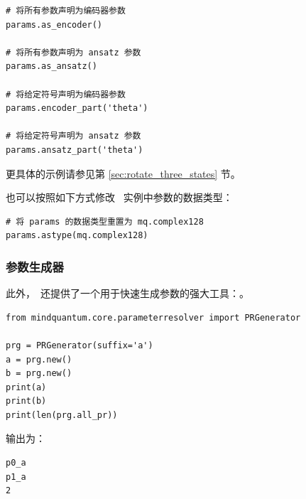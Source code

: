 \begin{lstlisting}
# 将所有参数声明为编码器参数
params.as_encoder()

# 将所有参数声明为 ansatz 参数
params.as_ansatz()

# 将给定符号声明为编码器参数
params.encoder_part('theta')

# 将给定符号声明为 ansatz 参数
params.ansatz_part('theta')
\end{lstlisting}

更具体的示例请参见第 \ref{sec:rotate_three_states} 节。

也可以按照如下方式修改 \ParameterResolver\ 实例中参数的数据类型：
\begin{lstlisting}
# 将 params 的数据类型重置为 mq.complex128
params.astype(mq.complex128)
\end{lstlisting}

\subsubsection{参数生成器}

此外，\MindQuantum\ 还提供了一个用于快速生成参数的强大工具：\PRGenerator。
\begin{lstlisting}
from mindquantum.core.parameterresolver import PRGenerator

prg = PRGenerator(suffix='a')
a = prg.new()
b = prg.new()
print(a)
print(b)
print(len(prg.all_pr))
\end{lstlisting}
输出为：
\begin{lstlisting}
p0_a
p1_a
2
\end{lstlisting}
